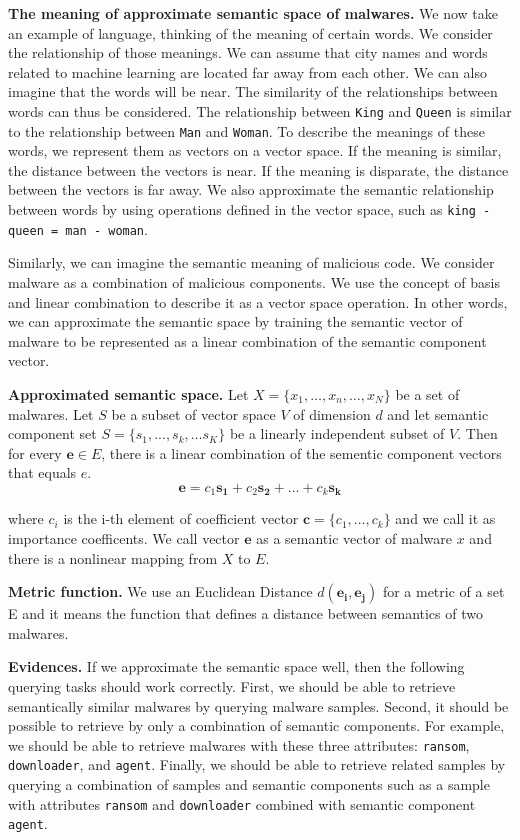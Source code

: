 \textbf{The meaning of approximate semantic space of malwares. }
We now take an example of language, thinking of the meaning of certain words. We consider the relationship of those meanings. We can assume that city names and words related to machine learning are located far away from each other. We can also imagine that the words will be near. The similarity of the relationships between words can thus be considered. The relationship between \texttt{King} and \texttt{Queen} is similar to the relationship between \texttt{Man} and \texttt{Woman}. To describe the meanings of these words, we represent them as vectors on a vector space. If the meaning is similar, the distance between the vectors is near. If the meaning is disparate, the distance between the vectors is far away. We also approximate the semantic relationship between words by using operations defined in the vector space, such as \texttt{king - queen = man - woman}.

Similarly, we can imagine the semantic meaning of malicious code. We consider malware as a combination of malicious components. We use the concept of basis and linear combination to describe it as a vector space operation. In other words, we can approximate the semantic space by training the semantic vector of malware to be represented as a linear combination of the semantic component vector.


\textbf{Approximated semantic space. }
Let $X = \{x_1, …, x_n, …, x_N\}$ be a set of malwares.
Let $S$ be a subset of vector space $V$ of dimension $d$ and let semantic component set $S = \{s_1, ... , s_k, … s_K\}$ be a linearly independent subset of $V$.  
Then for every $\mathbf{e} \in E$, there is a linear combination of the sementic component vectors that equals $e$.
\[
\mathbf{e} = c_1\mathbf{s_1} + c_2\mathbf{s_2} + … + c_k\mathbf{s_k} 
\]

where $c_i$ is the i-th element of coefficient vector $ \mathbf{c} = \{c_1, ... , c_k\}$ and we call it as importance coefficents.
We call vector $\mathbf{e}$ as a semantic vector of malware $x$ and there is a nonlinear mapping from $X$ to $E$. 

\textbf{Metric function. }
We use an Euclidean Distance $d(\mathbf{e_i}, \mathbf{e_j})$ for a metric of a set E and it means the function that defines a distance between  semantics of two malwares. 


\textbf{Evidences. } 
If we approximate the semantic space well, then the following querying tasks should work correctly. First, we should be able to retrieve semantically similar malwares by querying malware samples. Second, it should be possible to retrieve by only a combination of semantic components. For example, we should be able to retrieve malwares with these three attributes: \texttt{ransom}, \texttt{downloader}, and \texttt{agent}. Finally, we should be able to retrieve related samples by querying a combination of samples and semantic components such as a sample with attributes \texttt{ransom} and \texttt{downloader} combined with semantic component \texttt{agent}.


